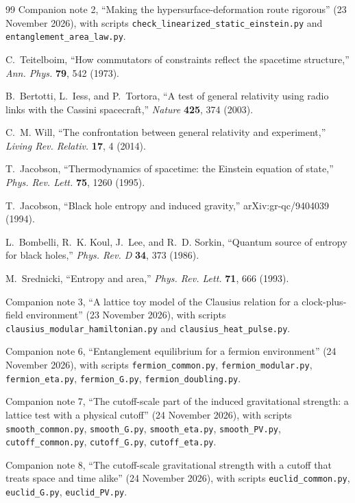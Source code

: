 \documentclass[11pt]{article}
\theoremstyle{plain}
\theoremstyle{definition}
\theoremstyle{remark}
\begin{document}
\begin{thebibliography}{99}
Companion note 2, ``Making the hypersurface-deformation route rigorous'' (23 November 2026), with scripts \texttt{check\_linearized\_static\_einstein.py} and \texttt{entanglement\_area\_law.py}.

C.~Teitelboim, ``How commutators of constraints reflect the spacetime structure,'' \emph{Ann. Phys.} \textbf{79}, 542 (1973).

B.~Bertotti, L.~Iess, and P.~Tortora, ``A test of general relativity using radio links with the Cassini spacecraft,'' \emph{Nature} \textbf{425}, 374 (2003).

C.~M. Will, ``The confrontation between general relativity and experiment,'' \emph{Living Rev. Relativ.} \textbf{17}, 4 (2014).

T.~Jacobson, ``Thermodynamics of spacetime: the Einstein equation of state,'' \emph{Phys. Rev. Lett.} \textbf{75}, 1260 (1995).

T.~Jacobson, ``Black hole entropy and induced gravity,'' arXiv:gr-qc/9404039 (1994).

L.~Bombelli, R.~K. Koul, J.~Lee, and R.~D. Sorkin, ``Quantum source of entropy for black holes,'' \emph{Phys. Rev. D} \textbf{34}, 373 (1986).

M.~Srednicki, ``Entropy and area,'' \emph{Phys. Rev. Lett.} \textbf{71}, 666 (1993).

Companion note 3, ``A lattice toy model of the Clausius relation for a clock-plus-field environment'' (23 November 2026), with scripts \texttt{clausius\_modular\_hamiltonian.py} and \texttt{clausius\_heat\_pulse.py}.

Companion note 6, ``Entanglement equilibrium for a fermion environment'' (24 November 2026), with scripts \texttt{fermion\_common.py}, \texttt{fermion\_modular.py}, \texttt{fermion\_eta.py}, \texttt{fermion\_G.py}, \texttt{fermion\_doubling.py}.

Companion note 7, ``The cutoff-scale part of the induced gravitational strength: a lattice test with a physical cutoff'' (24 November 2026), with scripts \texttt{smooth\_common.py}, \texttt{smooth\_G.py}, \texttt{smooth\_eta.py}, \texttt{smooth\_PV.py}, \texttt{cutoff\_common.py}, \texttt{cutoff\_G.py}, \texttt{cutoff\_eta.py}.

Companion note 8, ``The cutoff-scale gravitational strength with a cutoff that treats space and time alike'' (24 November 2026), with scripts \texttt{euclid\_common.py}, \texttt{euclid\_G.py}, \texttt{euclid\_PV.py}.


\end{thebibliography}
\end{document}
